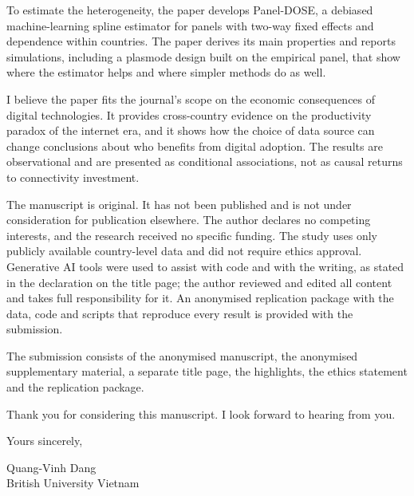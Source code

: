 \documentclass[11pt]{article}
\begin{document}
To estimate the heterogeneity, the paper develops Panel-DOSE, a debiased machine-learning spline estimator for panels with two-way fixed effects and dependence within countries. The paper derives its main properties and reports simulations, including a plasmode design built on the empirical panel, that show where the estimator helps and where simpler methods do as well.

I believe the paper fits the journal's scope on the economic consequences of digital technologies. It provides cross-country evidence on the productivity paradox of the internet era, and it shows how the choice of data source can change conclusions about who benefits from digital adoption. The results are observational and are presented as conditional associations, not as causal returns to connectivity investment.

The manuscript is original. It has not been published and is not under consideration for publication elsewhere. The author declares no competing interests, and the research received no specific funding. The study uses only publicly available country-level data and did not require ethics approval. Generative AI tools were used to assist with code and with the writing, as stated in the declaration on the title page; the author reviewed and edited all content and takes full responsibility for it. An anonymised replication package with the data, code and scripts that reproduce every result is provided with the submission.

The submission consists of the anonymised manuscript, the anonymised supplementary material, a separate title page, the highlights, the ethics statement and the replication package.

Thank you for considering this manuscript. I look forward to hearing from you.

Yours sincerely,

Quang-Vinh Dang\\
British University Vietnam
\end{document}
